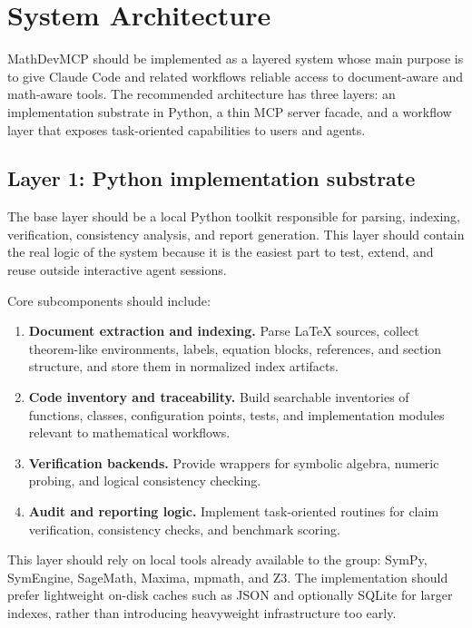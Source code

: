 \chapter{System Architecture}

MathDevMCP should be implemented as a layered system whose main purpose is to give Claude Code and related workflows reliable access to document-aware and math-aware tools. The recommended architecture has three layers: an implementation substrate in Python, a thin MCP server facade, and a workflow layer that exposes task-oriented capabilities to users and agents.

\section{Layer 1: Python implementation substrate}

The base layer should be a local Python toolkit responsible for parsing, indexing, verification, consistency analysis, and report generation. This layer should contain the real logic of the system because it is the easiest part to test, extend, and reuse outside interactive agent sessions.

Core subcomponents should include:

\begin{enumerate}[label=\arabic*.]
  \item \textbf{Document extraction and indexing.} Parse LaTeX sources, collect theorem-like environments, labels, equation blocks, references, and section structure, and store them in normalized index artifacts.
  \item \textbf{Code inventory and traceability.} Build searchable inventories of functions, classes, configuration points, tests, and implementation modules relevant to mathematical workflows.
  \item \textbf{Verification backends.} Provide wrappers for symbolic algebra, numeric probing, and logical consistency checking.
  \item \textbf{Audit and reporting logic.} Implement task-oriented routines for claim verification, consistency checks, and benchmark scoring.
\end{enumerate}

This layer should rely on local tools already available to the group: SymPy, SymEngine, SageMath, Maxima, mpmath, and Z3. The implementation should prefer lightweight on-disk caches such as JSON and optionally SQLite for larger indexes, rather than introducing heavyweight infrastructure too early.

